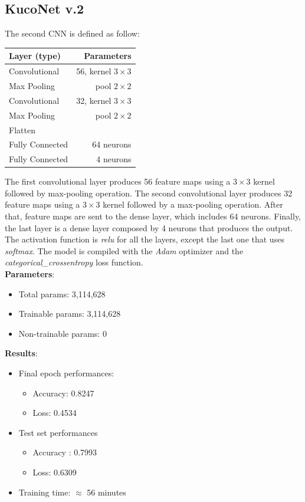 \documentclass[11pt]{article}
\begin{document}
\subsection{KucoNet v.2}
The second CNN is defined as follow:
\begin{table}[H]
	\begin{center}
		\begin{tabular}{|l|r|}
			\hline
			\textbf{Layer (type)} & \textbf{Parameters} \\
			\hline
			Convolutional & 56, kernel $3 \times 3$ \\
			\hline
			Max Pooling & pool $2 \times 2$ \\
			\hline
			Convolutional & 32, kernel $3 \times 3$ \\
			\hline
			Max Pooling & pool $2 \times 2$ \\
			\hline
			Flatten & \\
			\hline
			Fully Connected & 64 neurons  \\
			\hline
			Fully Connected & 4 neurons \\
			\hline 
		\end{tabular}
	\end{center}
\end{table}
The first convolutional layer produces 56 feature maps using a $3 \times 3$ kernel followed by max-pooling operation. The second convolutional layer produces 32 feature maps using a $3 \times 3$ kernel followed by a max-pooling operation. After that, feature maps are sent to the dense layer, which includes 64 neurons. Finally, the last layer is a dense layer  composed by 4 neurons that produces the output. The activation function is \textit{relu} for all the layers, except the last one that uses \textit{softmax}.  The model is compiled with the \textit{Adam} optimizer and the \textit{categorical\_crossentropy} loss function. \\
\textbf{Parameters}:
\begin{itemize}
	\item Total params: 3,114,628
	\item Trainable params: 3,114,628
	\item Non-trainable params: 0
\end{itemize}
\textbf{Results}:
\begin{itemize}
	\item Final epoch performances:
	\begin{itemize}
		\item Accuracy: 0.8247
		\item Loss: 0.4534
	\end{itemize}
	\item Test set performances
	\begin{itemize}
		\item Accuracy : 0.7993
		\item Loss: 0.6309
	\end{itemize}
	\item Training time: $\approx$ 56 minutes
\end{itemize}
\end{document}
